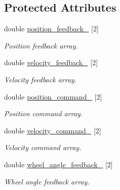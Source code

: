 \subsection*{Protected Attributes}
\begin{DoxyCompactItemize}
\item 
\mbox{\label{classBasicRobotSim_ad6401472a3ca72298fedfb7a35c57ca5}} 
double \hyperlink{classBasicRobotSim_ad6401472a3ca72298fedfb7a35c57ca5}{position\+\_\+feedback\+\_\+} \mbox{[}2\mbox{]}
\begin{DoxyCompactList}\small\item\em Position feedback array. \end{DoxyCompactList}\item 
\mbox{\label{classBasicRobotSim_a7388b862cb3c8d56c78a5eda6fe2acc6}} 
double \hyperlink{classBasicRobotSim_a7388b862cb3c8d56c78a5eda6fe2acc6}{velocity\+\_\+feedback\+\_\+} \mbox{[}2\mbox{]}
\begin{DoxyCompactList}\small\item\em Velocity feedback array. \end{DoxyCompactList}\item 
\mbox{\label{classBasicRobotSim_a9fafb5a6015b915bd3ba9de35f9c1a8d}} 
double \hyperlink{classBasicRobotSim_a9fafb5a6015b915bd3ba9de35f9c1a8d}{position\+\_\+command\+\_\+} \mbox{[}2\mbox{]}
\begin{DoxyCompactList}\small\item\em Position command array. \end{DoxyCompactList}\item 
\mbox{\label{classBasicRobotSim_a679a476e5c6e125a91316f4acaf53c24}} 
double \hyperlink{classBasicRobotSim_a679a476e5c6e125a91316f4acaf53c24}{velocity\+\_\+command\+\_\+} \mbox{[}2\mbox{]}
\begin{DoxyCompactList}\small\item\em Velocity command array. \end{DoxyCompactList}\item 
\mbox{\label{classBasicRobotSim_a885d1e8d5034e7f8a81d8ed0e1f5e5cc}} 
double \hyperlink{classBasicRobotSim_a885d1e8d5034e7f8a81d8ed0e1f5e5cc}{wheel\+\_\+angle\+\_\+feedback\+\_\+} \mbox{[}2\mbox{]}
\begin{DoxyCompactList}\small\item\em Wheel angle feedback array. \end{DoxyCompactList}\item 

\end{DoxyCompactItemize}
